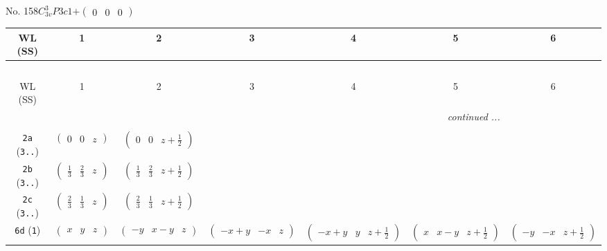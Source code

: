 \documentclass[fleqn,9pt,landscape]{jsarticle}
\begin{document}
\newpage
No. 158\quad$C_{3v}^{3}$\quad$P3c1$\quad[ trigonal ]\quad$+\begin{pmatrix} 0 & 0 & 0 \end{pmatrix}$
\begin{center}
\renewcommand{\arraystretch}{1.2}
\begin{longtable}{ccccccc}
 \hline \hline
WL (SS) & 1 & 2 & 3 & 4 & 5 & 6 \\ \hline \endfirsthead

\multicolumn{6}{l}{\tablename\ \thetable{}} \\
 \hline \hline
WL (SS) & 1 & 2 & 3 & 4 & 5 & 6 \\ \hline \endhead

 \hline \hline
\multicolumn{6}{r}{\footnotesize\it continued ...} \\ \endfoot

 \hline \hline
\multicolumn{6}{r}{} \\ \endlastfoot

{\tt 2a} ({\tt 3..}) & $ \begin{pmatrix} 0 & 0 & z \end{pmatrix} $ & $ \begin{pmatrix} 0 & 0 & z + \frac{1}{2} \end{pmatrix} $ & $  $ & $  $ & $  $ & $  $ \\ \hline
{\tt 2b} ({\tt 3..}) & $ \begin{pmatrix} \frac{1}{3} & \frac{2}{3} & z \end{pmatrix} $ & $ \begin{pmatrix} \frac{1}{3} & \frac{2}{3} & z + \frac{1}{2} \end{pmatrix} $ & $  $ & $  $ & $  $ & $  $ \\ \hline
{\tt 2c} ({\tt 3..}) & $ \begin{pmatrix} \frac{2}{3} & \frac{1}{3} & z \end{pmatrix} $ & $ \begin{pmatrix} \frac{2}{3} & \frac{1}{3} & z + \frac{1}{2} \end{pmatrix} $ & $  $ & $  $ & $  $ & $  $ \\ \hline
{\tt 6d} ({\tt 1}) & $ \begin{pmatrix} x & y & z \end{pmatrix} $ & $ \begin{pmatrix} - y & x - y & z \end{pmatrix} $ & $ \begin{pmatrix} - x + y & - x & z \end{pmatrix} $ & $ \begin{pmatrix} - x + y & y & z + \frac{1}{2} \end{pmatrix} $ & $ \begin{pmatrix} x & x - y & z + \frac{1}{2} \end{pmatrix} $ & $ \begin{pmatrix} - y & - x & z + \frac{1}{2} \end{pmatrix} $ \\
\end{longtable}
\end{center}
\end{document}
